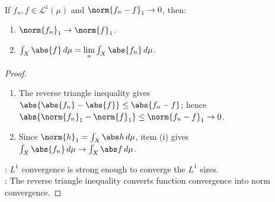 \begin{proposition} \label{prop:l1-convergence-controls-absolute-integrals} \\
If $f_n,f\in\mathscr{L}^1(\mu)$ and $\norm{f_n-f}_1\to0$, then:
\begin{enumerate}[label=(\roman*)]
\setlength{\itemsep}{0pt}
\item $\norm{f_n}_1\to\norm{f}_1$.
\item $\int_X\abs{f}\,d\mu=\lim\limits_n\int_X\abs{f_n}\,d\mu$.
\end{enumerate}
\begin{proof}
\begin{enumerate}[label=(\roman*)]
\setlength{\itemsep}{0pt}
\item The reverse triangle inequality gives $\abs{\abs{f_n}-\abs{f}}\leq\abs{f_n-f}$; hence $\abs{\norm{f_n}_1-\norm{f}_1}\leq\norm{f_n-f}_1\to0$.
\item Since $\norm{h}_1=\int_X\abs h\,d\mu$, item (i) gives $\int_X\abs{f_n}\,d\mu\to\int_X\abs f\,d\mu$.
\end{enumerate}
: $L^1$ convergence is strong enough to converge the $L^1$ sizes.\\
: The reverse triangle inequality converts function convergence into norm convergence.
\end{proof}
\end{proposition}


